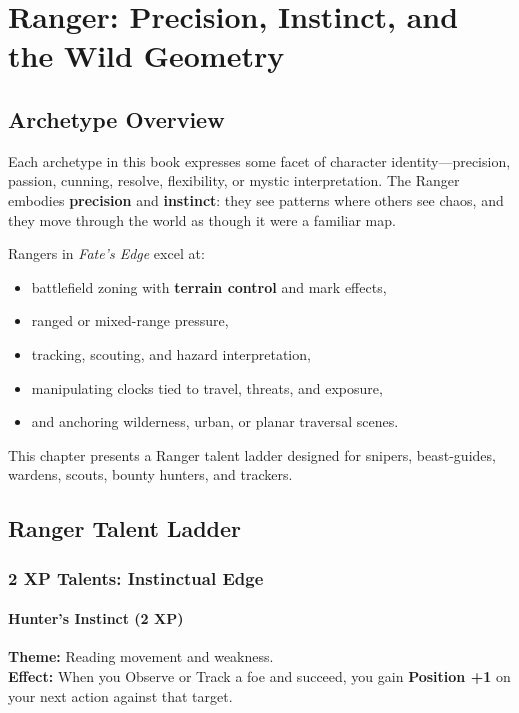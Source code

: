 \documentclass[11pt]{book}
\begin{document}

\chapter{Ranger: Precision, Instinct, and the Wild Geometry}

\section{Archetype Overview}

Each archetype in this book expresses some facet of character identity---precision, passion,
cunning, resolve, flexibility, or mystic interpretation.  
The Ranger embodies \textbf{precision} and \textbf{instinct}:
they see patterns where others see chaos, and they move through the world
as though it were a familiar map.

Rangers in \textit{Fate's Edge} excel at:
\begin{itemize}
  \item battlefield zoning with \textbf{terrain control} and mark effects,
  \item ranged or mixed-range pressure,
  \item tracking, scouting, and hazard interpretation,
  \item manipulating clocks tied to travel, threats, and exposure,
  \item and anchoring wilderness, urban, or planar traversal scenes.
\end{itemize}

This chapter presents a Ranger talent ladder designed for snipers,
beast-guides, wardens, scouts, bounty hunters, and trackers.

\section{Ranger Talent Ladder}

\subsection{2 XP Talents: Instinctual Edge}

\subsubsection{Hunter's Instinct (2 XP)}
\textbf{Theme:} Reading movement and weakness.\\
\textbf{Effect:} When you Observe or Track a foe and succeed,
you gain \textbf{Position +1} on your next action against that target.
\end{document}
